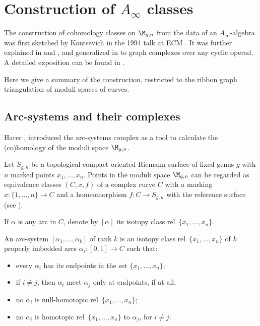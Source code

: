 

\chapter{Construction of $A_\infty$ classes}
\label{cha:construction}

The construction of cohomology classes on $\M_{g,n}$ from the data of
an $A_\infty$-algebra was first sketched by Kontsevich in the 1994 talk at
ECM \cite{kontsevich;feynman}. It was further explained in
\cite{penkava-schwarz} and \cite{penkava;graph-complexes}, and
generalized in \cite{markl;cyclic} to graph complexes over any cyclic
operad.  A detailed exposition can be found in \cite{conant-vogtmann}.

Here we give a summary of the construction, restricted to the ribbon
graph triangulation of moduli spaces of curves.


\section{Arc-systems and their complexes}
\label{sec:arc-systems}

Harer \cite{harer;cohomological-dimension}, introduced the arc-systems
complex as a tool to calculate the (co)homology of the moduli space
$\M_{g,n}$.

Let $S_{g,n}$ be a topological compact oriented Riemann surface of
fixed genus $g$ with $n$ marked points $x_1, \ldots, x_n$.  Points in the
moduli space $\M_{g,n}$ can be regarded as equivalence classes
$(C,x,f)$ of a complex curve $C$ with a marking $x:\{1,\ldots,n\}\to C$ and a
homeomorphism $f:C\to S_{g,n}$ with the reference surface (see
).

If $\alpha$ is any arc in $C$, denote by $[\alpha]$ its isotopy class rel~$\{x_1,
\ldots, x_n\}$.

\begin{definition}
  An arc-system $[\alpha_1, \ldots, \alpha_k]$ of rank $k$ is an isotopy class
  rel~$\{x_1, \ldots, x_n\}$ of $k$ properly imbedded arcs $\alpha_i : [0,1] \to C$
  such that:
  \begin{itemize}
  \item every $\alpha_i$ has its endpoints in the set $\{x_1, \ldots, x_n\}$;
  \item if $i \neq j$, then $\alpha_i$ meet $\alpha_j$ only at endpoints, if at all;
  \item no $\alpha_i$ is null-homotopic rel~$\{x_1, \ldots, x_n\}$;
  \item no $\alpha_i$ is homotopic rel~$\{x_1, \ldots, x_n\}$ to $\alpha_j$, for $i \neq
    j$;
  \end{itemize}
\end{definition}


